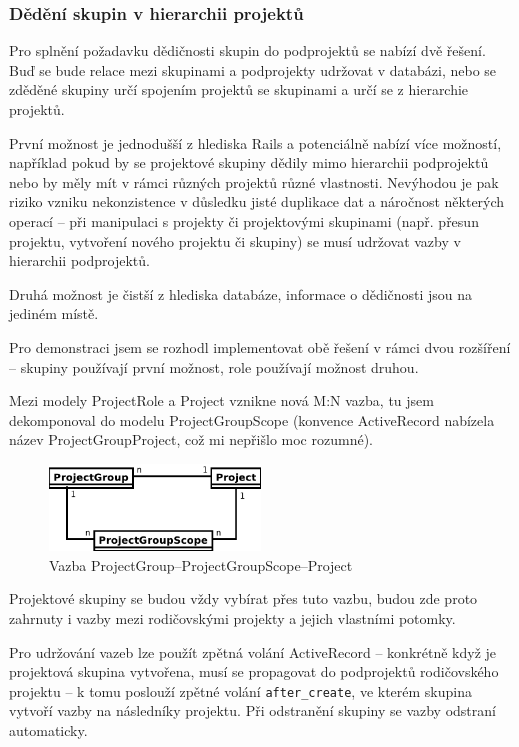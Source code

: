 \documentclass[thesis=B,czech]{FITthesis}[2012/05/02]
\begin{document}
\subsubsection{Dědění skupin v hierarchii projektů}
\label{sec:proj_group_inherit}

Pro splnění požadavku dědičnosti skupin do podprojektů se nabízí dvě
řešení. Buď se bude relace mezi skupinami a podprojekty udržovat v
databázi, nebo se zděděné skupiny určí spojením projektů se skupinami a
určí se z hierarchie projektů.

První možnost je jednodušší z hlediska Rails a potenciálně nabízí více
možností, například pokud by se projektové skupiny dědily mimo
hierarchii podprojektů nebo by měly mít v rámci různých projektů různé
vlastnosti. Nevýhodou je pak riziko vzniku nekonzistence v důsledku
jisté duplikace dat a náročnost některých operací -- při manipulaci s
projekty či projektovými skupinami (např. přesun projektu, vytvoření
nového projektu či skupiny) se musí udržovat vazby v hierarchii
podprojektů.

Druhá možnost je čistší z hlediska databáze, informace o dědičnosti jsou
na jediném místě.

Pro demonstraci jsem se rozhodl implementovat obě řešení v rámci dvou
rozšíření -- skupiny používají první možnost, role používají možnost
druhou.

Mezi modely ProjectRole a Project vznikne nová M:N vazba, tu jsem
dekomponoval do modelu ProjectGroupScope (konvence ActiveRecord nabízela
název ProjectGroupProject, což mi nepřišlo moc rozumné).

\begin{figure}[htbp]
\centering
\includegraphics[width=0.5\textwidth]{group-er4.pdf}
\caption{Vazba ProjectGroup--ProjectGroupScope--Project}
\end{figure}

Projektové skupiny se budou vždy vybírat přes tuto vazbu, budou zde
proto zahrnuty i vazby mezi rodičovskými projekty a jejich vlastními
potomky.

Pro udržování vazeb lze použít zpětná volání ActiveRecord -- konkrétně
když je projektová skupina vytvořena, musí se propagovat do podprojektů
rodičovského projektu -- k tomu poslouží zpětné volání
\lstinline!after_create!, ve kterém skupina vytvoří vazby na následníky
projektu. Při odstranění skupiny se vazby odstraní automaticky.
\end{document}
